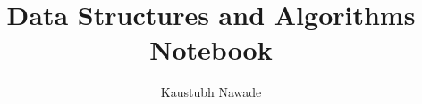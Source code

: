 \documentclass[10pt]{article}
\title{\vspace{-4ex}\Large{Data Structures and Algorithms Notebook}}
\author{Kaustubh Nawade}
\date{}
\begin{document}
\begin{landscape}
\begin{multicols}{2}

\maketitle
\vspace{-5ex}
\tableofcontents

\pagestyle{fancy}




\end{multicols}
\end{landscape}
\end{document}
